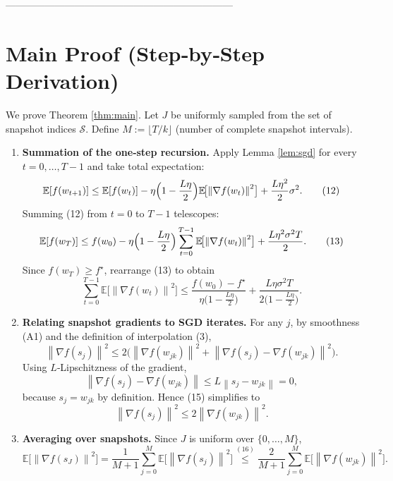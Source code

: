 \documentclass{article}
\newcommand{\E}{\mathbb{E}}
\newcommand{\norm}[1]{\left\lVert #1\right\rVert}
\begin{document}
---------------------------------------------------------------------

\section*{Main Proof (Step‑by‑Step Derivation)}
We prove Theorem \ref{thm:main}. Let $J$ be uniformly sampled from the set of snapshot indices $\mathcal S$.
Define $M:=\lfloor T/k\rfloor$ (number of complete snapshot intervals).

\begin{enumerate}[label=[Step \arabic*]]
    \item \textbf{Summation of the one‑step recursion.}  
    Apply Lemma \ref{lem:sgd} for every $t=0,\dots,T-1$ and take total expectation:
    \[
        \E[f(w_{t+1})]\le \E[f(w_t)]-\eta\Bigl(1-\frac{L\eta}{2}\Bigr)\E\!\bigl[\norm{\nabla f(w_t)}^2\bigr]
        +\frac{L\eta^2}{2}\sigma^2 .
    \tag{12}
    \]
    Summing (12) from $t=0$ to $T-1$ telescopes:
    \[
        \E[f(w_T)]\le f(w_0)-\eta\Bigl(1-\frac{L\eta}{2}\Bigr)\sum_{t=0}^{T-1}
        \E\!\bigl[\norm{\nabla f(w_t)}^2\bigr]
        +\frac{L\eta^2\sigma^2 T}{2}.
    \tag{13}
    \]
    Since $f(w_T)\ge f^{\star}$, rearrange (13) to obtain
    \[
        \sum_{t=0}^{T-1}\E\!\bigl[\norm{\nabla f(w_t)}^2\bigr]
        \le \frac{f(w_0)-f^{\star}}{\eta\bigl(1-\frac{L\eta}{2}\bigr)}
            +\frac{L\eta\sigma^2 T}{2\bigl(1-\frac{L\eta}{2}\bigr)} .
    \tag{14}
    \]

    \item \textbf{Relating snapshot gradients to SGD iterates.}  
    For any $j$, by smoothness (A1) and the definition of interpolation (3),
    \[
        \norm{\nabla f(s_j)}^2
        \le 2\bigl(\norm{\nabla f(w_{jk})}^2+\norm{\nabla f(s_j)-\nabla f(w_{jk})}^2\bigr).
    \tag{15}
    \]
    Using $L$‑Lipschitzness of the gradient,
    \[
        \norm{\nabla f(s_j)-\nabla f(w_{jk})}\le L\norm{s_j-w_{jk}}=0,
    \]
    because $s_j=w_{jk}$ by definition. Hence (15) simplifies to
    \[
        \norm{\nabla f(s_j)}^2\le 2\norm{\nabla f(w_{jk})}^2 .
    \tag{16}
    \]

    \item \textbf{Averaging over snapshots.}  
    Since $J$ is uniform over $\{0,\dots,M\}$,
    \[
        \E\!\bigl[\norm{\nabla f(s_J)}^2\bigr]
        =\frac{1}{M+1}\sum_{j=0}^{M}\E\!\bigl[\norm{\nabla f(s_j)}^2\bigr]
        \overset{(16)}{\le}
        \frac{2}{M+1}\sum_{j=0}^{M}\E\!\bigl[\norm{\nabla f(w_{jk})}^2\bigr].
    \tag{17}
    \]


\end{enumerate}
\end{document}
